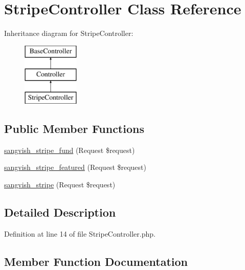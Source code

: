 \hypertarget{class_responsive_1_1_http_1_1_controllers_1_1_stripe_controller}{}\section{Stripe\+Controller Class Reference}
\label{class_responsive_1_1_http_1_1_controllers_1_1_stripe_controller}
Inheritance diagram for Stripe\+Controller\+:\begin{figure}[H]
\begin{center}
\leavevmode
\includegraphics[height=3.000000cm]{class_responsive_1_1_http_1_1_controllers_1_1_stripe_controller}
\end{center}
\end{figure}
\subsection*{Public Member Functions}
\begin{DoxyCompactItemize}
\item 
\mbox{\hyperlink{class_responsive_1_1_http_1_1_controllers_1_1_stripe_controller_ae98aba9c82aca648744acc2284c3a2c3}{sangvish\+\_\+stripe\+\_\+fund}} (Request \$request)
\item 
\mbox{\hyperlink{class_responsive_1_1_http_1_1_controllers_1_1_stripe_controller_a405fe5b4c3f1853771959f339c5d00c3}{sangvish\+\_\+stripe\+\_\+featured}} (Request \$request)
\item 
\mbox{\hyperlink{class_responsive_1_1_http_1_1_controllers_1_1_stripe_controller_acda126ab3cb487f23ba428176ccf9eb2}{sangvish\+\_\+stripe}} (Request \$request)
\end{DoxyCompactItemize}


\subsection{Detailed Description}


Definition at line 14 of file Stripe\+Controller.\+php.



\subsection{Member Function Documentation}
\mbox{\label{class_responsive_1_1_http_1_1_controllers_1_1_stripe_controller_acda126ab3cb487f23ba428176ccf9eb2}} 
